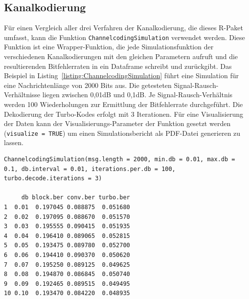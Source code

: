 \subsection{Kanalkodierung}
\label{kapitel:beispiele_simulation_kanalkodierung}
Für einen Vergleich aller drei Verfahren der Kanalkodierung, die dieses R-Paket umfasst, kann die Funktion \texttt{ChannelcodingSimulation} verwendet werden. Diese Funktion ist eine Wrapper-Funktion, die jede Simulationsfunktion der verschiedenen Kanalkodierungen mit den gleichen Parametern aufruft und die resultierenden Bitfehlerraten in ein Dataframe schreibt und zurückgibt. Das Beispiel in Listing~\ref{listing:ChannelcodingSimulation} führt eine Simulation für eine Nachrichtenlänge von 2000 Bits aus. Die getesteten Signal-Rausch-Verhältnisse liegen zwischen 0,01dB und 0,1dB. Je Signal-Rausch-Verhältnis werden 100 Wiederholungen zur Ermittlung der Bitfehlerrate durchgeführt. Die Dekodierung der Turbo-Kodes erfolgt mit 3 Iterationen. Für eine Visualisierung der Daten kann der Visualisierungs-Parameter der Funktion gesetzt werden (\texttt{visualize = TRUE}) um einen Simulationsbericht als PDF-Datei generieren zu lassen.
\begin{lstlisting}[caption=Kanalkodierungs-Simulation, label={listing:ChannelcodingSimulation}, float=!th]
ChannelcodingSimulation(msg.length = 2000, min.db = 0.01, max.db = 0.1, db.interval = 0.01, iterations.per.db = 100, turbo.decode.iterations = 3)

     db block.ber conv.ber turbo.ber
1  0.01  0.197045 0.088875  0.051680
2  0.02  0.197095 0.088670  0.051570
3  0.03  0.195555 0.090415  0.051935
4  0.04  0.196410 0.089065  0.052815
5  0.05  0.193475 0.089780  0.052700
6  0.06  0.194410 0.090370  0.050620
7  0.07  0.195250 0.089125  0.049625
8  0.08  0.194870 0.086845  0.050740
9  0.09  0.192465 0.089515  0.049495
10 0.10  0.193470 0.084220  0.048935
\end{lstlisting}

